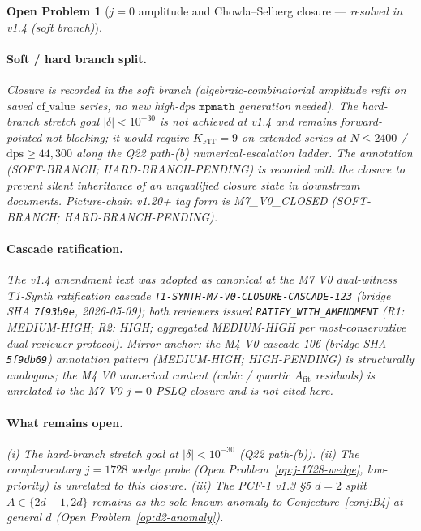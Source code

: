 \documentclass[11pt,a4paper]{article}
\newtheorem{problem}{Open Problem}
\theoremstyle{definition}
\theoremstyle{remark}
\begin{document}
\begin{problem}[$j=0$ amplitude and Chowla--Selberg
closure --- \emph{resolved in v1.4 (soft branch)}]
\paragraph{Soft / hard branch split.}
Closure is recorded in the \emph{soft branch} (algebraic-combinatorial
amplitude refit on saved $\mathrm{cf\_value}$ series, no new high-dps
$\mathtt{mpmath}$ generation needed). The hard-branch stretch goal
$|\delta| < 10^{-30}$ is \emph{not} achieved at v1.4 and remains
forward-pointed not-blocking; it would require $K_{\mathrm{FIT}}=9$
on extended series at $N\le 2400$ / $\mathrm{dps}\ge 44{,}300$ along
the Q22 path-(b) numerical-escalation ladder. The annotation
\emph{(SOFT-BRANCH; HARD-BRANCH-PENDING)} is recorded with the closure
to prevent silent inheritance of an unqualified closure state in
downstream documents. Picture-chain v1.20+ tag form is
\textsf{M7\_V0\_CLOSED (SOFT-BRANCH; HARD-BRANCH-PENDING)}.

\paragraph{Cascade ratification.}
The v1.4 amendment text was adopted as canonical at the M7 V0 dual-witness
T1-Synth ratification cascade
\texttt{T1-SYNTH-M7-V0-CLOSURE-CASCADE-123} (bridge SHA \texttt{7f93b9e},
2026-05-09); both reviewers issued \verb|RATIFY_WITH_AMENDMENT|
(R1: MEDIUM-HIGH; R2: HIGH; aggregated MEDIUM-HIGH per
most-conservative dual-reviewer protocol). Mirror anchor: the M4 V0
cascade-106 (bridge SHA \texttt{5f9db69}) annotation pattern
\emph{(MEDIUM-HIGH; HIGH-PENDING)} is structurally analogous; the M4 V0
\emph{numerical} content (cubic / quartic $A_{\mathrm{fit}}$ residuals)
is unrelated to the M7 V0 $j=0$ PSLQ closure and is \emph{not} cited here.

\paragraph{What remains open.}
(i) The hard-branch stretch goal at $|\delta|<10^{-30}$
(Q22 path-(b)). (ii) The complementary $j=1728$ wedge probe
(Open Problem~\ref{op:j-1728-wedge}, low-priority) is unrelated to
this closure. (iii) The PCF-1 v1.3 \S5 $d=2$ split
$A\in\{2d-1,2d\}$ remains as the sole known anomaly to
Conjecture~\ref{conj:B4} at general $d$ (Open Problem~\ref{op:d2-anomaly}).
\end{problem}
\end{document}
